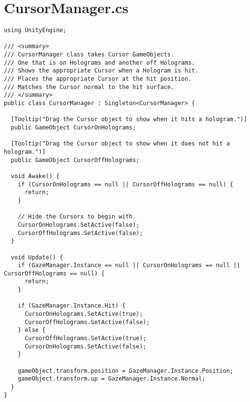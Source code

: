 \section{CursorManager.cs}
\begin{lstlisting}[caption=CursorManager.cs, label=code:CursorManager]
using UnityEngine;

/// <summary>
/// CursorManager class takes Cursor GameObjects.
/// One that is on Holograms and another off Holograms.
/// Shows the appropriate Cursor when a Hologram is hit.
/// Places the appropriate Cursor at the hit position.
/// Matches the Cursor normal to the hit surface.
/// </summary>
public class CursorManager : Singleton<CursorManager> {

  [Tooltip("Drag the Cursor object to show when it hits a hologram.")]
  public GameObject CursorOnHolograms;
	
  [Tooltip("Drag the Cursor object to show when it does not hit a hologram.")]
  public GameObject CursorOffHolograms;
	
  void Awake() {
	if (CursorOnHolograms == null || CursorOffHolograms == null) {
	  return;
	}
	
	// Hide the Cursors to begin with.
	CursorOnHolograms.SetActive(false);
	CursorOffHolograms.SetActive(false);
  }
	
  void Update() {
	if (GazeManager.Instance == null || CursorOnHolograms == null || CursorOffHolograms == null) {
	  return;
	}
	
	if (GazeManager.Instance.Hit) {
 	  CursorOnHolograms.SetActive(true);
 	  CursorOffHolograms.SetActive(false);
	} else {
	  CursorOffHolograms.SetActive(true);
	  CursorOnHolograms.SetActive(false);
	}
	
	gameObject.transform.position = GazeManager.Instance.Position;	
	gameObject.transform.up = GazeManager.Instance.Normal;
  }
}
\end{lstlisting}

